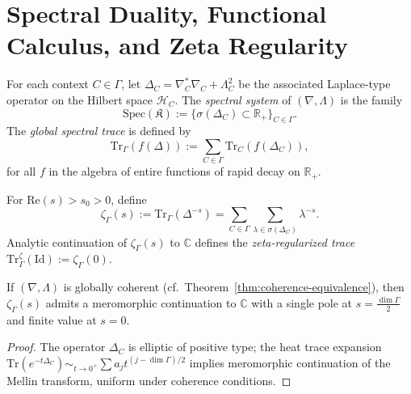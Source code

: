 \section{Spectral Duality, Functional Calculus, and Zeta Regularity}
\label{sec:vol2-part5-spectral-duality}\relax\hspace{0pt}

\begin{definition}\label{def:spectral-system}
For each context $C\in\Gamma$, let $\Delta_C=\nabla_C^*\nabla_C+\Lambda_C^2$ be the associated Laplace-type operator on the Hilbert space $\mathcal H_C$.
The \emph{spectral system} of $(\nabla,\Lambda)$ is the family
\[
\mathrm{Spec}(\mathfrak K):=\big\{\sigma(\Delta_C)\subset\mathbb R_+\big\}_{C\in\Gamma}.
\]
The \emph{global spectral trace} is defined by
\[
\mathrm{Tr}_\Gamma(f(\Delta)):=\sum_{C\in\Gamma}\mathrm{Tr}_C(f(\Delta_C)),
\]
for all $f$ in the algebra of entire functions of rapid decay on $\mathbb R_+$.
\end{definition}

\begin{definition}\label{def:zeta}
For $\mathrm{Re}(s)>s_0>0$, define
\[
\zeta_{\Gamma}(s):=\mathrm{Tr}_\Gamma(\Delta^{-s})
=\sum_{C\in\Gamma}\sum_{\lambda\in\sigma(\Delta_C)}\lambda^{-s}.
\]
Analytic continuation of $\zeta_\Gamma(s)$ to $\mathbb C$ defines the \emph{zeta-regularized trace} 
$\mathrm{Tr}_\Gamma^{\zeta}(\mathrm{Id}):=\zeta_\Gamma(0)$.
\end{definition}

\begin{theorem}\label{thm:zeta-analytic}
If $(\nabla,\Lambda)$ is globally coherent (cf.\ Theorem~\ref{thm:coherence-equivalence}), then $\zeta_\Gamma(s)$ admits a meromorphic continuation to $\mathbb C$ with a single pole at $s=\frac{\dim\Gamma}{2}$ and finite value at $s=0$.
\end{theorem}

\begin{proof}
The operator $\Delta_C$ is elliptic of positive type; the heat trace expansion $\mathrm{Tr}(e^{-t\Delta_C})\sim_{t\to0^+}\sum a_j t^{(j-\dim\Gamma)/2}$ implies meromorphic continuation of the Mellin transform, uniform under coherence conditions. \relax
\end{proof}


